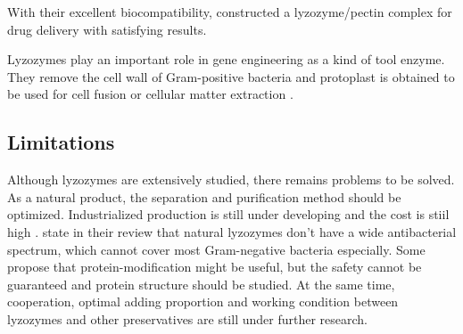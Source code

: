 With their excellent biocompatibility, \citet{Lin2015} constructed a lyzozyme/pectin complex for drug delivery with satisfying results.

Lyzozymes play an important role in gene engineering as a kind of tool enzyme. They remove the cell wall of Gram-positive bacteria and protoplast is obtained to be used for cell fusion or cellular  matter extraction \citep{Yu-tong2006}.

\subsection{Limitations}
Although lyzozymes are extensively studied, there remains problems to be solved. As a natural product, the separation and purification method should be optimized. Industrialized production is still under developing and the cost is stiil high \citet{ZHAI2015}. \citet{Zhao2009} state in their review that natural lyzozymes don't have a wide antibacterial spectrum, which cannot cover most  Gram-negative bacteria especially. Some propose that protein-modification might be useful, but the safety cannot be guaranteed and protein structure should be studied. At the same time, cooperation, optimal adding proportion and working condition between lyzozymes and other preservatives are still under further research.


